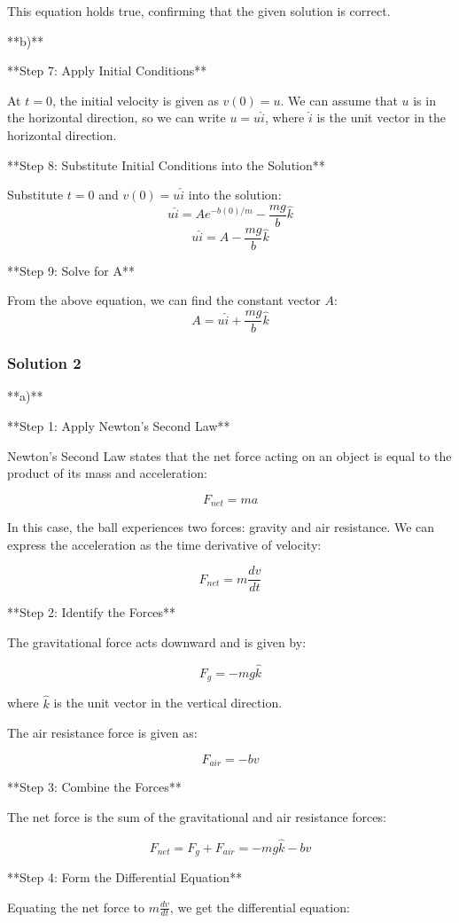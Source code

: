 \documentclass{article}
\begin{document}
This equation holds true, confirming that the given solution is correct.

**b)**

**Step 7: Apply Initial Conditions**

At $t=0$, the initial velocity is given as $v(0) = u$. We can assume that $u$ is in the horizontal direction, so we can write $u = u\hat{i}$, where $\hat{i}$ is the unit vector in the horizontal direction.

**Step 8: Substitute Initial Conditions into the Solution**

Substitute $t=0$ and $v(0) = u\hat{i}$ into the solution:
$$u\hat{i} = Ae^{-b(0)/m} - \frac{mg}{b}\hat{k}$$
$$u\hat{i} = A - \frac{mg}{b}\hat{k}$$

**Step 9: Solve for A**

From the above equation, we can find the constant vector $A$:
$$A = u\hat{i} + \frac{mg}{b}\hat{k}$$

\subsubsection{Solution 2}
**a)**

**Step 1: Apply Newton's Second Law**

Newton's Second Law states that the net force acting on an object is equal to the product of its mass and acceleration:

$$F_{net} = ma$$

In this case, the ball experiences two forces: gravity and air resistance. We can express the acceleration as the time derivative of velocity:

$$F_{net} = m\frac{dv}{dt}$$

**Step 2: Identify the Forces**

The gravitational force acts downward and is given by:

$$F_g = -mg\hat{k}$$

where $\hat{k}$ is the unit vector in the vertical direction.

The air resistance force is given as:

$$F_{air} = -bv$$

**Step 3: Combine the Forces**

The net force is the sum of the gravitational and air resistance forces:

$$F_{net} = F_g + F_{air} = -mg\hat{k} - bv$$

**Step 4: Form the Differential Equation**

Equating the net force to $m\frac{dv}{dt}$, we get the differential equation:
\end{document}
